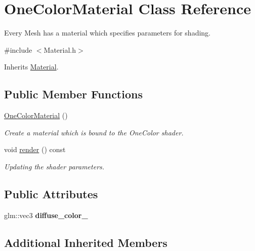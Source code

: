 \hypertarget{class_one_color_material}{\section{One\-Color\-Material Class Reference}
\label{class_one_color_material}
}


Every Mesh has a material which specifies parameters for shading.  




{\ttfamily \#include $<$Material.\-h$>$}



Inherits \hyperlink{class_material}{Material}.

\subsection*{Public Member Functions}
\begin{DoxyCompactItemize}
\item 
\hypertarget{class_one_color_material_a9945390953f538af744fd32790d027c2}{\hyperlink{class_one_color_material_a9945390953f538af744fd32790d027c2}{One\-Color\-Material} ()}\label{class_one_color_material_a9945390953f538af744fd32790d027c2}

\begin{DoxyCompactList}\small\item\em Create a material which is bound to the One\-Color shader. \end{DoxyCompactList}\item 
void \hyperlink{class_one_color_material_ad2ca1db5ab1ac80975fffa907e83087b}{render} () const 
\begin{DoxyCompactList}\small\item\em Updating the shader parameters. \end{DoxyCompactList}\end{DoxyCompactItemize}
\subsection*{Public Attributes}
\begin{DoxyCompactItemize}
\item 
\hypertarget{class_one_color_material_afd62561d881e41bbf6bc9601dc0e2c15}{glm\-::vec3 {\bfseries diffuse\-\_\-color\-\_\-}}\label{class_one_color_material_afd62561d881e41bbf6bc9601dc0e2c15}

\end{DoxyCompactItemize}
\subsection*{Additional Inherited Members}


